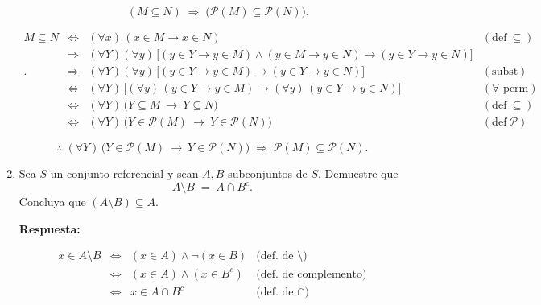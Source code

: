 \documentclass[12pt,letterpaper]{exam}
\begin{document}
\begin{enumerate}
\[\quad (M\subseteq N)\;\Rightarrow\; \big(\mathcal P(M)\subseteq \mathcal P(N)\big).\]

{\small
\[
\begin{array}{rcll}
M\subseteq N
&\iff& (\forall x)\,(x\in M \to x\in N) & (\mathrm{def}\ \subseteq)\\[3pt]

&\Rightarrow& (\forall Y)(\forall y)\,\big[(y\in Y\to y\in M)\land(y\in M\to y\in N)\to(y\in Y\to y\in N)\big]
&\\[3pt]
.
&\Rightarrow& (\forall Y)(\forall y)\,\big[(y\in Y\to y\in M)\to(y\in Y\to y\in N)\big]
& (\mathrm{subst})\\[3pt]

&\iff& (\forall Y)\,\big[(\forall y)\,(y\in Y\to y\in M)\to(\forall y)\,(y\in Y\to y\in N)\big]
& (\forall\text{-perm})\\[3pt]

&\iff& (\forall Y)\,\big(Y\subseteq M\ \to\ Y\subseteq N\big)
& (\mathrm{def}\ \subseteq)\\[3pt]

&\iff& (\forall Y)\,\big(Y\in\mathcal P(M)\ \to\ Y\in\mathcal P(N)\big)
& (\mathrm{def}\ \mathcal P)
\end{array}
\]
} %

\[
\therefore\; (\forall Y)\,\big(Y\in\mathcal P(M)\ \to\ Y\in\mathcal P(N)\big)
\;\Rightarrow\; \mathcal P(M)\subseteq \mathcal P(N).
\]

    \item Sea $S$ un conjunto referencial y sean $A,B$ subconjuntos de $S$. Demuestre que
    \[
    A\setminus B \;=\; A\cap B^{c}.
    \]
    Concluya que $(A\setminus B)\subseteq A$.
    
    \textbf{Respuesta:}

\[
\begin{array}{rcll}
x\in A\setminus B
&\iff& (x\in A)\land \neg(x\in B) & \text{(def.\ de $\setminus$)}\\[2pt]
&\iff& (x\in A)\land (x\in B^{c}) & \text{(def.\ de complemento)}\\[2pt]
&\iff& x\in A\cap B^{c} & \text{(def.\ de $\cap$)}
\end{array}
\]


\end{enumerate}
\end{document}

